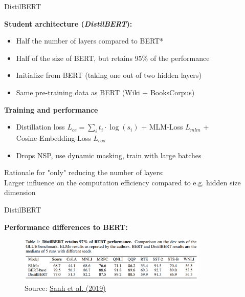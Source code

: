 \begin{frame}{DistilBERT \href{https://arxiv.org/pdf/1910.01108.pdf}{}}

\textbf{Student architecture (\textit{DistilBERT}):}

\begin{itemize}
	\item Half the number of layers compared to BERT*
 	\item Half of the size of BERT, but retains 95\% of the performance
	\item Initialize from BERT (taking one out of two hidden layers)
	\item Same pre-training data as BERT (Wiki + BooksCorpus)
\end{itemize}

\vspace{.3cm}

\textbf{Training and performance}

\begin{itemize}
	\item Distillation loss $L_{ce} = \sum_i t_i \cdot \log(s_i)$ + MLM-Loss $L_{mlm}$ + \\
				Cosine-Embedding-Loss $L_{cos}$
	\item Drops NSP, use dynamic masking, train with large batches
\end{itemize}

\vspace{1cm}

{\footnotesize *Rationale for "only" reducing the number of layers:\\
Larger influence on the computation efficiency compared to e.g. hidden size dimension}
	
\end{frame}


\begin{frame}{DistilBERT \href{https://arxiv.org/pdf/1910.01108.pdf}{}}

\vfill

	\textbf{Performance differences to BERT:}

	\begin{figure}
		\centering
		\includegraphics[width = 9cm]{figure/distilbert-vs-sota.png}\\ 
		\footnotesize{Source:} \href{https://arxiv.org/pdf/1910.01108.pdf}{\footnotesize Sanh et al. (2019)}
	\end{figure}

\vfill

\end{frame}

